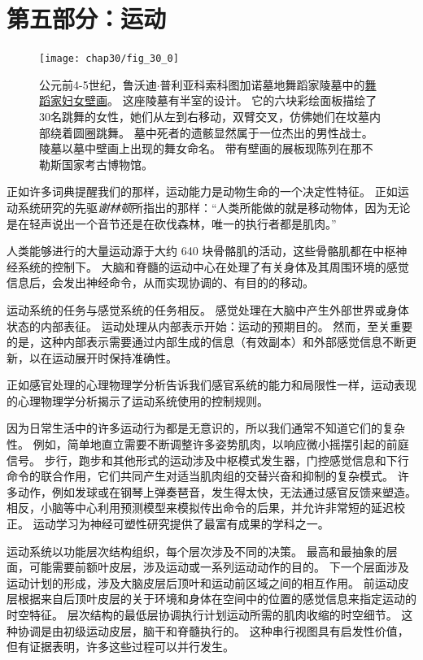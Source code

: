 \chapter*{第五部分：运动}

\begin{figure}[htbp]
	\centering
	\texttt{[image: chap30/fig\_30\_0]}
	\caption{公元前4-5世纪，鲁沃迪$\cdot$普利亚科索科图加诺墓地舞蹈家陵墓中的\href{https://en.wikipedia.org/wiki/Tomb_of_the_Dancers}{舞蹈家妇女壁画}。
		这座陵墓有半室的设计。
		它的六块彩绘面板描绘了30名跳舞的女性，她们从左到右移动，双臂交叉，仿佛她们在坟墓内部绕着圆圈跳舞。
		墓中死者的遗骸显然属于一位杰出的男性战士。
		陵墓以墓中壁画上出现的舞女命名。
		带有壁画的展板现陈列在那不勒斯国家考古博物馆。 }
	\label{fig:30_0}
\end{figure}


正如许多词典提醒我们的那样，运动能力是动物生命的一个决定性特征。
正如运动系统研究的先驱\textit{谢林顿}所指出的那样：“人类所能做的就是移动物体，因为无论是在轻声说出一个音节还是在砍伐森林，唯一的执行者都是肌肉。”


人类能够进行的大量运动源于大约 640 块骨骼肌的活动，这些骨骼肌都在中枢神经系统的控制下。
大脑和脊髓的运动中心在处理了有关身体及其周围环境的感觉信息后，会发出神经命令，从而实现协调的、有目的的移动。


运动系统的任务与感觉系统的任务相反。
感觉处理在大脑中产生外部世界或身体状态的内部表征。
运动处理从内部表示开始：运动的预期目的。
然而，至关重要的是，这种内部表示需要通过内部生成的信息（有效副本）和外部感觉信息不断更新，以在运动展开时保持准确性。


正如感官处理的心理物理学分析告诉我们感官系统的能力和局限性一样，运动表现的心理物理学分析揭示了运动系统使用的控制规则。


因为日常生活中的许多运动行为都是无意识的，所以我们通常不知道它们的复杂性。
例如，简单地直立需要不断调整许多姿势肌肉，以响应微小摇摆引起的前庭信号。
步行，跑步和其他形式的运动涉及中枢模式发生器，门控感觉信息和下行命令的联合作用，它们共同产生对适当肌肉组的交替兴奋和抑制的复杂模式。
许多动作，例如发球或在钢琴上弹奏琶音，发生得太快，无法通过感官反馈来塑造。
相反，小脑等中心利用预测模型来模拟传出命令的后果，并允许非常短的延迟校正。
运动学习为神经可塑性研究提供了最富有成果的学科之一。


运动系统以功能层次结构组织，每个层次涉及不同的决策。
最高和最抽象的层面，可能需要前额叶皮层，涉及运动或一系列运动动作的目的。
下一个层面涉及运动计划的形成，涉及大脑皮层后顶叶和运动前区域之间的相互作用。
前运动皮层根据来自后顶叶皮层的关于环境和身体在空间中的位置的感觉信息来指定运动的时空特征。
层次结构的最低层协调执行计划运动所需的肌肉收缩的时空细节。
这种协调是由初级运动皮层，脑干和脊髓执行的。
这种串行视图具有启发性价值，但有证据表明，许多这些过程可以并行发生。


